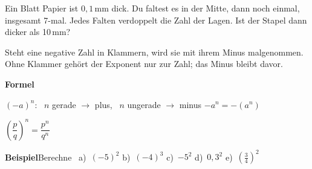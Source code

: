 \documentclass[11pt]{article}
\makeatletter
\newcommand{\aufg}[3]{\par\noindent\makebox[0pt][r]{#3}\begin{minipage}[t]{\linewidth}#1\end{minipage}\par}
\newcommand{\nr}[1]{\makebox[7mm][l]{\textbf{#1}}}
\newlength{\kr}
\newcommand{\karomerk}[2]{\protected@write\@auxout{}{\string\karoseite{#1}{#2}{\thepage}}}
\newcommand{\karoseite}[3]{\expandafter\xdef\csname karo@#1@#2\endcsname{#3}}
\makeatother
\begin{document}
\medskip
\aufg{\nr{4.}Ein Blatt Papier ist $0{,}1$\,mm dick. Du faltest es in der Mitte, dann noch einmal, insgesamt 7-mal. Jedes Falten verdoppelt die Zahl der Lagen. Ist der Stapel dann dicker als 10\,mm?}{}{{\scriptsize\color{mbgrau}Ziel\hspace{2mm}}}
\medskip
\par\vspace{3mm}\setlength{\kr}{\dimexpr\pagegoal-\pagetotal-10mm\relax}%
\ifdim\kr>12mm\karomerk{k}{A}\noindent{\scriptsize\color{mbgrau}Platz zum Rechnen}\par\nointerlineskip\vspace{1mm}\noindent
\begin{tikzpicture}\clip (0,0) rectangle ({\linewidth-0.5mm},\kr);\draw[black!16,line width=0.3pt,step=5mm] (0,0) grid (\linewidth,\kr);\end{tikzpicture}\fi\par
\clearpage\label{s:B}\noindent\colorbox{black!12}{}\hspace{3mm}{\Large\bfseries Minus und Komma in der Potenz}\par\smallskip
\noindent Steht eine negative Zahl in Klammern, wird sie mit ihrem Minus malgenommen. Ohne Klammer gehört der Exponent nur zur Zahl; das Minus bleibt davor.\par\medskip
\noindent\textbf{Formel}\par\nopagebreak\noindent\hspace*{4mm}\begin{minipage}{\dimexpr\linewidth-4mm\relax}$(-a)^n$: \ $n$ gerade $\to$ plus, \ $n$ ungerade $\to$ minus \qquad $-a^n = -(a^n)$\par $\left(\dfrac{p}{q}\right)^n = \dfrac{p^n}{q^n}$ \end{minipage}\par\medskip
\noindent\textbf{Beispiel}\quad Berechne \ a)~$(-5)^2$ \qquad b)~$(-4)^3$ \qquad c)~$-5^2$ \qquad d)~$0{,}3^2$ \qquad e)~$\left(\frac{3}{4}\right)^2$\par\smallskip
\end{document}
